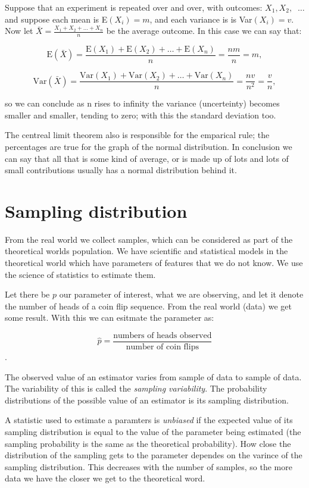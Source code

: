 Suppose that an experiment is repeated over and over, with outcomes: $X_1, X_2,
$ $~\ldots$ and suppose each mean is E$(X_i) = m$, and each variance is is
Var$(X_i)=v$. Now let $\bar{X} = \frac{X_1 + X_2 +\ldots + X_n}{n}$ be the
average outcome. In this case we can say that:

\[ \mbox{E}(\bar{X}) = \frac{\mbox{E}(X_1) + \mbox{E}(X_2) + \ldots +
		\mbox{E}(X_n)}{n} = \frac{nm}{n} = m,\]

\[ \mbox{Var}(\bar{X}) = \frac{\mbox{Var}(X_1) + \mbox{Var}(X_2) + \ldots +
		\mbox{Var}(X_n)}{n} = \frac{nv}{n^2} = \frac{v}{n},\]

so we can conclude as n rises to infinity the variance (uncerteinty) becomes
smaller and smaller, tending to zero; with this the standard deviation too.

The centreal limit theorem also is responsible for the emparical rule; the
percentages are true for the graph of the normal distribution. In conclusion we
can say that all that is some kind of average, or is made up of lots and lots of
small contributions usually has a normal distribution behind it.

\section{Sampling distribution}

From the real world we collect samples, which can be considered as part of the
theoretical worlds population. We have scientific and statistical models in the
theoretical world which have parameters of features that we do not know. We use
the science of statistics to estimate them.

Let there be $p$ our parameter of interest, what we are observing, and let it
denote the number of heads of a coin flip sequence. From the real world (data)
we get some result. With this we can esitmate the parameter as:

\[ \hat{p} = \frac{\mbox{numbers of heads observed}}{\mbox{number of coin
			flips}}\].

The observed value of an estimator varies from sample of data to sample of
data. The variability of this is called the \emph{sampling variability}. The
probability distributions of the possible value of an estimator is its sampling
distribution.

A statistic used to estimate a paramters is \emph{unbiased} if the expected
value of its sampling distribution is equal to the value of the parameter being
estimated (the sampling probability is the same as the theoretical
probability). How close the distribution of the sampling gets to the parameter
dependes on the varince of the sampling distribution. This decreases with the
number of samples, so the more data we have the closer we get to the
theoretical word.

